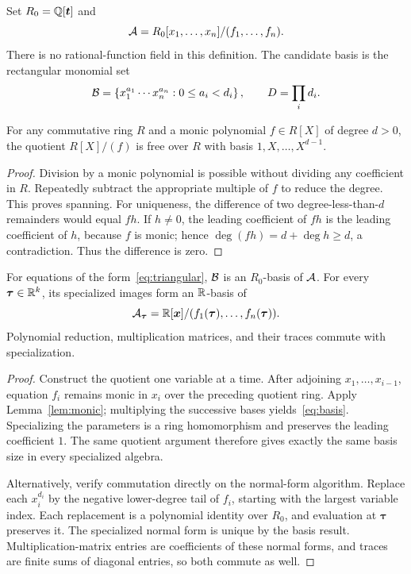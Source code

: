 Set $R_0=\mathbb Q[\bm t]$ and
\[
\mathcal A=R_0[x_1,\ldots,x_n]/(f_1,\ldots,f_n).
\]
There is no rational-function field in this definition. The candidate basis is the rectangular monomial set
\begin{equation}\label{eq:basis}
\mathcal B=\left\{x_1^{a_1}\cdots x_n^{a_n}:0\leq a_i<d_i\right\},
\qquad D=\prod_i d_i.
\end{equation}

\begin{lemma}\label{lem:monic}
For any commutative ring $R$ and a monic polynomial $f\in R[X]$ of degree $d>0$, the quotient $R[X]/(f)$ is free over $R$ with basis $1,X,\ldots,X^{d-1}$.
\end{lemma}
\begin{proof}
Division by a monic polynomial is possible without dividing any coefficient in $R$. Repeatedly subtract the appropriate multiple of $f$ to reduce the degree. This proves spanning. For uniqueness, the difference of two degree-less-than-$d$ remainders would equal $fh$. If $h\ne0$, the leading coefficient of $fh$ is the leading coefficient of $h$, because $f$ is monic; hence $\deg(fh)=d+\deg h\geq d$, a contradiction. Thus the difference is zero.
\end{proof}

\begin{theorem}\label{thm:tower}
For equations of the form~\eqref{eq:triangular}, $\mathcal B$ is an $R_0$-basis of $\mathcal A$. For every $\bm\tau\in\mathbb R^k$, its specialized images form an $\mathbb R$-basis of
\[
\mathcal A_{\bm\tau}=\mathbb R[\bm x]/(f_1(\bm\tau),\ldots,f_n(\bm\tau)).
\]
Polynomial reduction, multiplication matrices, and their traces commute with specialization.
\end{theorem}
\begin{proof}
Construct the quotient one variable at a time. After adjoining $x_1,\ldots,x_{i-1}$, equation $f_i$ remains monic in $x_i$ over the preceding quotient ring. Apply Lemma~\ref{lem:monic}; multiplying the successive bases yields~\eqref{eq:basis}. Specializing the parameters is a ring homomorphism and preserves the leading coefficient $1$. The same quotient argument therefore gives exactly the same basis size in every specialized algebra.

Alternatively, verify commutation directly on the normal-form algorithm. Replace each $x_i^{d_i}$ by the negative lower-degree tail of $f_i$, starting with the largest variable index. Each replacement is a polynomial identity over $R_0$, and evaluation at $\bm\tau$ preserves it. The specialized normal form is unique by the basis result. Multiplication-matrix entries are coefficients of these normal forms, and traces are finite sums of diagonal entries, so both commute as well.
\end{proof}

